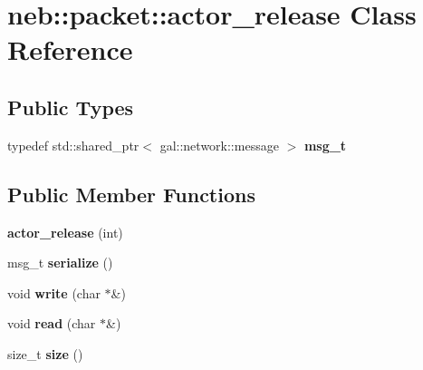 \hypertarget{classneb_1_1packet_1_1actor__release}{
\section{neb::packet::actor\_\-release Class Reference}
\label{classneb_1_1packet_1_1actor__release}
}
\subsection*{Public Types}
\begin{DoxyCompactItemize}
\item 
\hypertarget{classneb_1_1packet_1_1actor__release_a00cd43364472a514dd494ff623b38435}{
typedef std::shared\_\-ptr$<$ gal::network::message $>$ {\bfseries msg\_\-t}}
\label{classneb_1_1packet_1_1actor__release_a00cd43364472a514dd494ff623b38435}

\end{DoxyCompactItemize}
\subsection*{Public Member Functions}
\begin{DoxyCompactItemize}
\item 
\hypertarget{classneb_1_1packet_1_1actor__release_a427941df801ea77f69c914b2cc15519e}{
{\bfseries actor\_\-release} (int)}
\label{classneb_1_1packet_1_1actor__release_a427941df801ea77f69c914b2cc15519e}

\item 
\hypertarget{classneb_1_1packet_1_1actor__release_ae798345bb4f2a39ebaba785036d1da89}{
msg\_\-t {\bfseries serialize} ()}
\label{classneb_1_1packet_1_1actor__release_ae798345bb4f2a39ebaba785036d1da89}

\item 
\hypertarget{classneb_1_1packet_1_1actor__release_a4ac4e4dd9da7391390d84e3549a590ff}{
void {\bfseries write} (char $\ast$\&)}
\label{classneb_1_1packet_1_1actor__release_a4ac4e4dd9da7391390d84e3549a590ff}

\item 
\hypertarget{classneb_1_1packet_1_1actor__release_a510a1b4586257e3bd25766e2f29f4239}{
void {\bfseries read} (char $\ast$\&)}
\label{classneb_1_1packet_1_1actor__release_a510a1b4586257e3bd25766e2f29f4239}

\item 
\hypertarget{classneb_1_1packet_1_1actor__release_a8068e8fa32dc9e51670dcea7e20ef8d6}{
size\_\-t {\bfseries size} ()}
\label{classneb_1_1packet_1_1actor__release_a8068e8fa32dc9e51670dcea7e20ef8d6}

\end{DoxyCompactItemize}
